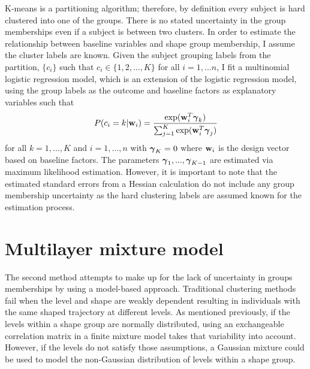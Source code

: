 K-means is a partitioning algorithm; therefore, by definition every subject is hard clustered into one of the groups. There is no stated uncertainty in the group memberships even if a subject is between two clusters. In order to estimate the relationship between baseline variables and shape group membership, I assume the cluster labels are known. Given the subject grouping labels from the partition, $\{c_{i}\}$ such that $c_{i}\in\{1,2,...,K\}$ for all $i=1,...n$, I fit a multinomial logistic regression model, which is an extension of the logistic regression model, using the group labels as the outcome and baseline factors as explanatory variables such that
$$P(c_{i} = k|\mathbf w_{i}) = \frac{\exp(\mathbf w_{i}^{T}\boldsymbol\gamma_{k})}{\sum_{j=1}^{K}\exp(\mathbf w_{i}^{T}\boldsymbol\gamma_{j})}$$
for all $k=1,...,K$ and $i=1,...,n$ with $\boldsymbol\gamma_{K}=0$ where $\mathbf w_{i}$ is the design vector based on baseline factors. The parameters $\boldsymbol\gamma_{1},...,\boldsymbol\gamma_{K-1}$ are estimated via maximum likelihood estimation. However, it is important to note that the estimated standard errors from a Hessian calculation do not include any group membership uncertainty  as the hard clustering labels are assumed known for the estimation process.


\section{Multilayer mixture model}\label{sec:multi}
The second method attempts to make up for the lack of uncertainty in groups memberships by using a model-based approach. Traditional clustering methods fail when the level and shape are weakly dependent resulting in individuals with the same shaped trajectory at different levels. As mentioned previously, if the levels within a shape group are normally distributed, using an exchangeable correlation matrix in a finite mixture model takes that variability into account. However, if the levels do not satisfy those assumptions, a Gaussian mixture could be used to model the non-Gaussian distribution of levels within a shape group. 

